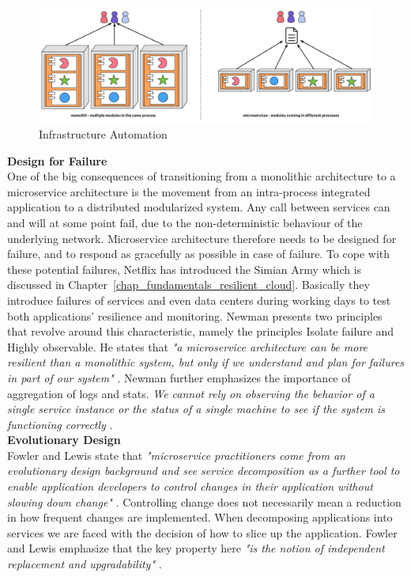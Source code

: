 \begin{figure}[H]
    \centering
    \includegraphics[width=\textwidth]{figures/micro-deployment}
    \caption{Infrastructure Automation \cite[p. 11]{lewis2014microservices}}
    \label{fig:micro-deployment}
\end{figure}

\noindent\textbf{Design for Failure} \\
One of the big consequences of transitioning from a monolithic architecture to a microservice architecture is the movement from an intra-process integrated application to a distributed modularized system. Any call between services can and will at some point fail, due to the non-deterministic behaviour of the underlying network. Microservice architecture therefore needs to be designed for failure, and to respond as gracefully as possible in case of failure. To cope with these potential failures, Netflix has introduced the Simian Army which is discussed in Chapter~\ref{chap_fundamentals_resilient_cloud}. Basically they introduce failures of services and even data centers during working days to test both applications' resilience and monitoring. Newman presents two principles that revolve around this characteristic, namely the principles Isolate failure and Highly observable. He states that \textit{"a microservice architecture can be more resilient than a monolithic system, but only if we understand and plan for failures in part of our system"} \cite[p. 248]{newman2015building}. Newman further emphasizes the importance of aggregation of logs and stats. \textit{We cannot rely on observing the behavior of a single service instance or the status of a single machine to see if the system is functioning correctly} \cite[p. 249]{newman2015building}. \\

\noindent\textbf{Evolutionary Design} \\
Fowler and Lewis state that \textit{"microservice practitioners come from an evolutionary design background and see service decomposition as a further tool to enable application developers to control changes in their application without slowing down change"} \cite[p. 12]{lewis2014microservices}. Controlling change does not necessarily mean a reduction in how frequent changes are implemented. When decomposing applications into services we are faced with the decision of how to slice up the application. Fowler and Lewis emphasize that the key property here \textit{"is the notion of independent replacement and upgradability"} \cite[p. 12]{lewis2014microservices}.

